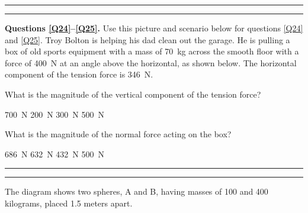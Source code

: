 \documentclass[answers]{exam}
\begin{document}
\begin{questions}
\bigskip
\hrule\hrule


\begin{EnvUplevel}
    \textbf{Questions \ref{Q24}--\ref{Q25}.} Use this picture and scenario below for questions \ref{Q24} and \ref{Q25}. Troy Bolton is helping his dad clean out the garage. He is pulling a box of old sports equipment with a mass of \SI{70}{kg} across the smooth floor with a force of \SI{400}{N} at an angle above the horizontal, as shown below. The horizontal component of the tension force is \SI{346}{N}.
\end{EnvUplevel}

\begin{center}
\end{center}

\question \label{Q24}
What is the magnitude of the vertical component of the tension force?

\begin{randomizeoneparchoices}[norandomize]
    \choice \SI{700}{N}
    \correctchoice \SI{200}{N}
    \choice \SI{300}{N}
    \choice \SI{500}{N}
\end{randomizeoneparchoices}

\question \label{Q25}
What is the magnitude of the normal force acting on the box?

\begin{randomizeoneparchoices}[norandomize]
    \choice \SI{686}{N}
    \choice \SI{632}{N}
    \choice \SI{432}{N}
    \correctchoice \SI{500}{N}
\end{randomizeoneparchoices}
\bigskip
\hrule\hrule

\question
The diagram shows two spheres, A and B, having masses of 100 and 400 kilograms, placed 1.5 meters apart.

\begin{center}
\end{center}


\end{questions}
\end{document}
